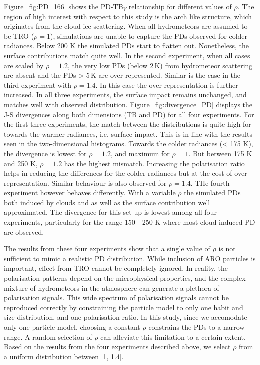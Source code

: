 \documentclass[amt, manuscript]{copernicus}
\begin{document}
Figure~\ref{fig:PD_166} shows the PD-TB$_V$ relationship for different values of $\rho$. The region of high interest with respect to this study is the arch like structure, which originates from the cloud ice scattering. When all hydrometeors are assumed to be TRO ($\rho = 1$), simulations are unable to capture the PDs observed for colder radiances. Below 200\,\,K the simulated PDs start to flatten out. Nonetheless, the surface contributions match quite well. In the second experiment, when all cases are scaled by $\rho = 1.2$, the very low PDs (below 2\,K) from hydrometeor scattering are absent and the PDs > 5\,K are over-represented. Similar is the case in the third experiment with $\rho = 1.4$. In this case the over-representation is further increased. In all three experiments, the surface impact remains unchanged, and matches well with observed distribution. Figure~\ref{fig:divergence_PD} displays the J-S divergences along both dimensions (TB and PD) for all four experiments. For the first three experiments, the match between the distributions is quite high for towards the warmer radiances, i.e. surface impact. This is in line with the results seen in the two-dimensional histograms. Towards the colder radiances (< 175\,\,K), the divergence is lowest for $\rho = 1.2$, and maximum for $\rho = 1$. But between 175\,\,K and 250\,\,K, $\rho = 1.2$ has the highest mismatch. Increasing the polarisation ratio helps in reducing the differences for the colder radiances but at the cost of over-representation. Similar behaviour is also observed for $\rho = 1.4$.
THe fourth experiment however behaves differently. With a variable $\rho$ the simulated PDs both induced by clouds and as well as the surface contribution well approximated. The divergence for this set-up is lowest among all four experiments, particularly for the range 150 - 250\,\,K where most cloud induced PD are observed. 

The results from these four experiments show that a single value of $\rho$ is not sufficient to mimic a realistic PD distribution. While inclusion of ARO particles is important, effect from TRO cannot be completely ignored. In reality, the polarisation patterns depend on the microphysical properties, and the complex mixture of hydrometeors in the atmosphere can generate a plethora of polarisation signals. This wide spectrum of polarisation signals cannot be reproduced correctly by constraining the particle model to only one habit and size distribution, and one polarisation ratio. In this study, since we accomodate only one particle model, choosing a constant $\rho$ constrains the PDs to a narrow range. A random selection of $\rho$ can alleviate this limitation to a certain extent. Based on the results from the four experiments described above, we select $\rho$ from a uniform distribution between [1, 1.4].
\end{document}
